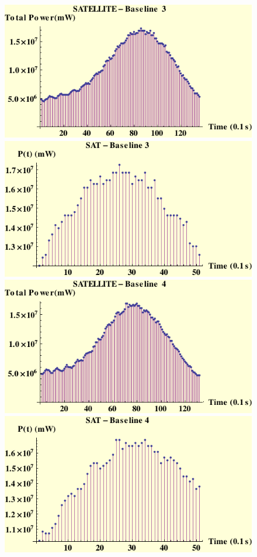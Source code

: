 \begin{figure}[htb]
\begin{center}
 \includegraphics[scale=0.7]{plots/sat3pow.pdf}
 \includegraphics[scale=0.7]{plots/sat3powc.pdf}
 \includegraphics[scale=0.7]{plots/sat4pow.pdf}
 \includegraphics[scale=0.7]{plots/sat4powc.pdf}

\end{center}
\end{figure}
